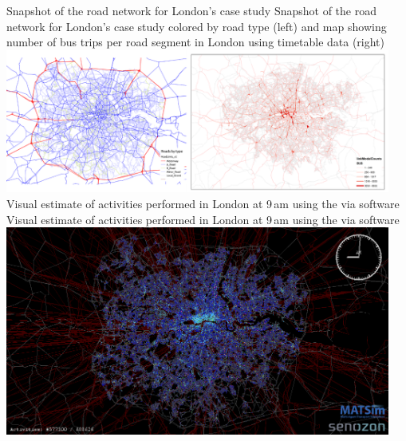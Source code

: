 \createfigure%
{Snapshot of the road network for London's case study}%
{Snapshot of the road network for London's case study colored by road type (left) and map showing number of bus trips per road segment in London using timetable data (right)}%
{\label{fig:london_fig1}}%
{\includegraphics[width=0.95\textwidth, angle=0]{scenarios/figures/london1.png}}%
{}
\createfigure%
{Visual estimate of activities performed in London at 9\,am using the \gls{via} software}%
{Visual estimate of activities performed in London at 9\,am using the \gls{via} software}%
{\label{fig:london_fig2}}%
{\includegraphics[width=0.95\textwidth, angle=0]{scenarios/figures/london2.png}}%
{}











